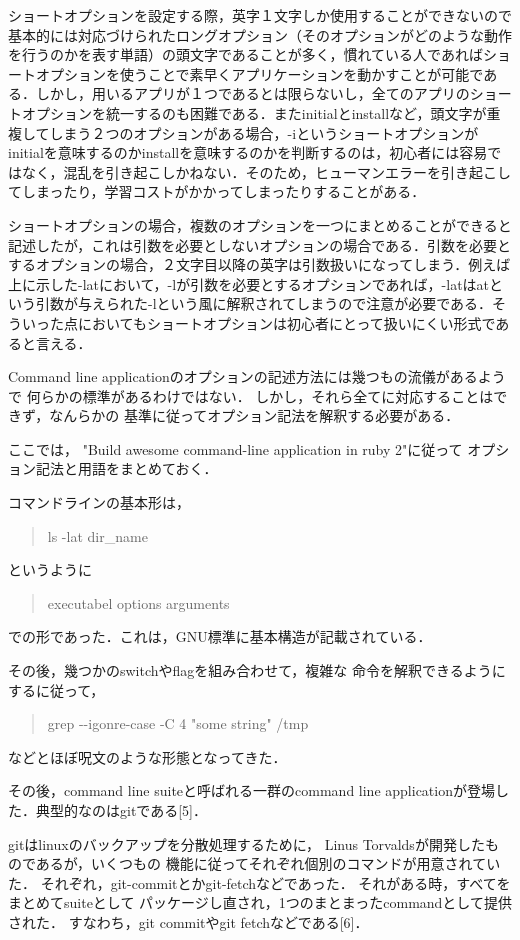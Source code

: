 ショートオプションを設定する際，英字１文字しか使用することができないので基本的には対応づけられたロングオプション（そのオプションがどのような動作を行うのかを表す単語）の頭文字であることが多く，慣れている人であればショートオプションを使うことで素早くアプリケーションを動かすことが可能である．しかし，用いるアプリが１つであるとは限らないし，全てのアプリのショートオプションを統一するのも困難である．またinitialとinstallなど，頭文字が重複してしまう２つのオプションがある場合，-iというショートオプションがinitialを意味するのかinstallを意味するのかを判断するのは，初心者には容易ではなく，混乱を引き起こしかねない．そのため，ヒューマンエラーを引き起こしてしまったり，学習コストがかかってしまったりすることがある．

ショートオプションの場合，複数のオプションを一つにまとめることができると記述したが，これは引数を必要としないオプションの場合である．引数を必要とするオプションの場合，２文字目以降の英字は引数扱いになってしまう．例えば上に示した-latにおいて，-lが引数を必要とするオプションであれば，-latはatという引数が与えられた-lという風に解釈されてしまうので注意が必要である．そういった点においてもショートオプションは初心者にとって扱いにくい形式であると言える．

Command line
applicationのオプションの記述方法には幾つもの流儀があるようで
何らかの標準があるわけではない．
しかし，それら全てに対応することはできず，なんらかの
基準に従ってオプション記法を解釈する必要がある．

ここでは， "Build awesome command-line application in ruby 2"に従って
オプション記法と用語をまとめておく．

コマンドラインの基本形は，

\begin{quote}
ls -lat dir\_name
\end{quote}
というように

\begin{quote}
executabel options arguments
\end{quote}
での形であった．これは，GNU標準に基本構造が記載されている．

その後，幾つかのswitchやflagを組み合わせて，複雑な
命令を解釈できるようにするに従って，

\begin{quote}
grep -\/-igonre-case -C 4 "some string" /tmp
\end{quote}
などとほぼ呪文のような形態となってきた．

その後，command line suiteと呼ばれる一群のcommand line
applicationが登場した．典型的なのはgitである{[}5{]}．

gitはlinuxのバックアップを分散処理するために， Linus
Torvaldsが開発したものであるが，いくつもの
機能に従ってそれぞれ個別のコマンドが用意されていた．
それぞれ，git-commitとかgit-fetchなどであった．
それがある時，すべてをまとめてsuiteとして
パッケージし直され，1つのまとまったcommandとして提供された．
すなわち，git commitやgit fetchなどである{[}6{]}．

    